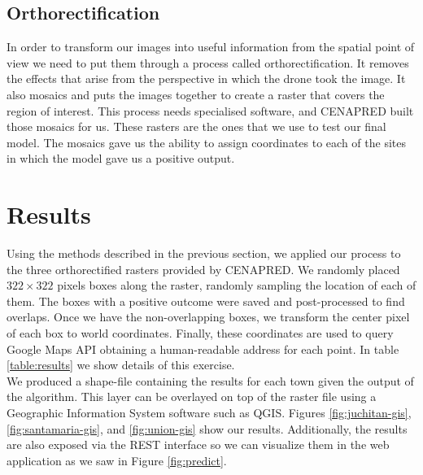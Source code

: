\subsection{Orthorectification}

In order to transform our images into useful information from the spatial point of view we need to put them through a process called orthorectification. It removes the effects that arise from the perspective in which the drone took the image. It also mosaics and puts the images together to create a raster that covers the region of interest. This process needs specialised software, and CENAPRED built those mosaics for us. These rasters are the ones that we use to test our final model. The mosaics gave us the ability to assign coordinates to each of the sites in which the model gave us a positive output.

\section{Results}

Using the methods described in the previous section, we applied our process to the three orthorectified rasters provided by CENAPRED. We randomly placed $322\times322$ pixels boxes along the raster, randomly sampling the location of each of them. The boxes with a positive outcome were saved and post-processed to find overlaps. Once we have the non-overlapping boxes, we transform the center pixel of each box to world coordinates. Finally, these coordinates are used to query Google Maps API obtaining a human-readable address for each point. In table \ref{table:results} we show details of this exercise.\\

We produced a shape-file containing the results for each town given the output of the algorithm. This layer can be overlayed on top of the raster file using a Geographic Information System software such as QGIS. Figures \ref{fig:juchitan-gis},\ref{fig:santamaria-gis}, and \ref{fig:union-gis} show our results. Additionally, the results are also exposed via the REST interface so we can visualize them in the web application as we saw in Figure \ref{fig:predict}.\\


